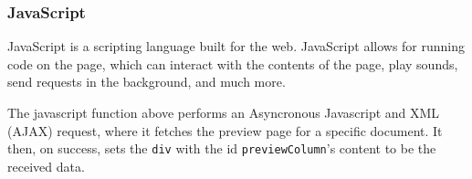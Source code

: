 \documentclass[../../master.tex]{subfiles}
\begin{document}
\subsubsection*{JavaScript}
JavaScript is a scripting language built for the web.
JavaScript allows for running code on the page, which can interact with the contents of the page, play sounds, send requests in the background, and much more.\cite{nixonweb}

The javascript function above performs an Asyncronous Javascript and XML (AJAX) request, where it fetches the preview page for a specific document.
It then, on success, sets the \texttt{div} with the id \texttt{previewColumn}'s content to be the received data.
\end{document}
